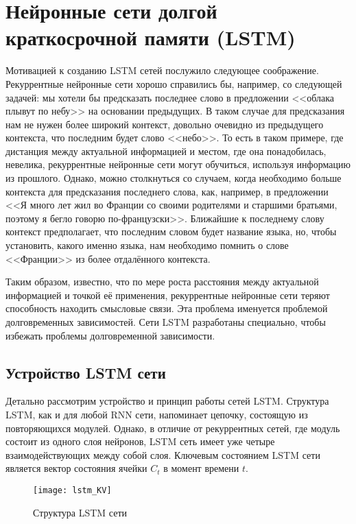 \documentclass[specialist,
               substylefile = spbu.rtx,
               subf, 
               colorlinks=true, 12pt]{disser}
\begin{document}
\section{Нейронные сети долгой краткосрочной памяти (LSTM)}

Мотивацией к созданию LSTM сетей послужило следующее соображение. Рекуррентные нейронные сети хорошо справились бы, например, со следующей задачей: мы хотели бы предсказать последнее слово в предложении <<облака плывут по небу>> на основании предыдущих. В таком случае для предсказания нам не нужен более широкий контекст, довольно очевидно из предыдущего контекста, что последним будет слово <<небо>>. То есть в таком примере, где дистанция между актуальной информацией и местом, где она понадобилась, невелика, рекуррентные нейронные сети могут обучиться, используя информацию из прошлого. Однако, можно столкнуться со случаем, когда необходимо больше контекста для предсказания последнего слова, как, например, в предложении <<Я много лет жил во Франции со своими родителями и старшими братьями, поэтому я бегло говорю по-французски>>. Ближайшие к последнему слову контекст предполагает, что последним словом будет название языка, но, чтобы установить, какого именно языка, нам необходимо помнить о слове <<Франции>> из более отдалённого контекста.


Таким образом,  известно, что по мере роста расстояния между актуальной информацией и точкой её применения, рекуррентные нейронные сети теряют способность находить смысловые связи. Эта проблема именуется проблемой долговременных зависимостей. Сети LSTM разработаны специально, чтобы избежать проблемы долговременной зависимости.

\subsection{Устройство LSTM сети}

Детально рассмотрим устройство и принцип работы сетей LSTM. Структура LSTM, как и для любой RNN сети, напоминает цепочку, состоящую из повторяющихся модулей. Однако, в отличие от рекуррентных сетей, где модуль состоит из одного слоя нейронов, LSTM сеть имеет уже четыре взаимодействующих между собой слоя. Ключевым состоянием LSTM сети является вектор состояния ячейки $C_t$ в момент времени $t$.

\begin{figure}[!h]
\begin{center}
\texttt{[image: lstm\_KV]}
\end{center}
\caption{Структура LSTM сети}
\end{figure}
\end{document}
